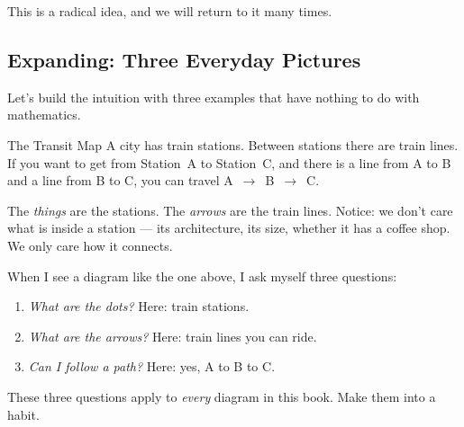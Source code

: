 This is a radical idea, and we will return to it many times.

\subsection{Expanding: Three Everyday Pictures}

Let's build the intuition with three examples that have nothing to do with
mathematics.

\begin{example}{The Transit Map}
A city has train stations. Between stations there are train lines. If you want
to get from Station~A to Station~C, and there is a line from A to B and a line
from B to C, you can travel A~$\to$~B~$\to$~C.

\medskip
\begin{center}
\end{center}
\medskip

The \emph{things} are the stations. The \emph{arrows} are the train lines.
Notice: we don't care what is inside a station --- its architecture, its size,
whether it has a coffee shop. We only care how it connects.
\end{example}

\begin{dialog}
When I see a diagram like the one above, I ask myself three questions:
\begin{enumerate}
  \item \emph{What are the dots?} Here: train stations.
  \item \emph{What are the arrows?} Here: train lines you can ride.
  \item \emph{Can I follow a path?} Here: yes, A to B to C.
\end{enumerate}
These three questions apply to \emph{every} diagram in this book. Make them
into a habit.
\end{dialog}

